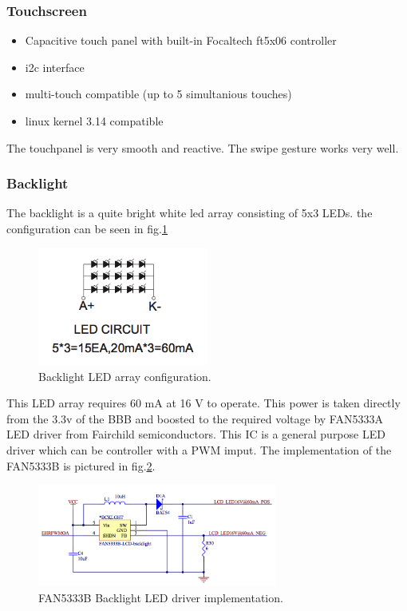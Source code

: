 \subsubsection{Touchscreen}

\begin{itemize}
  \item {Capacitive touch panel with built-in Focaltech ft5x06 controller}
  \item {i2c interface}
  \item {multi-touch compatible (up to 5 simultanious touches)}
  \item {linux kernel 3.14 compatible}
\end{itemize}
The touchpanel is very smooth and reactive. The swipe gesture works very well.

\subsubsection{Backlight}
\label{chap: backlight}
The backlight is a quite bright white led array consisting of 5x3 LEDs. the configuration can be seen in fig.\ref{fig:backlight_led}

\begin{figure}[!htb]
    \centering
    \includegraphics[width=0.5\textwidth,keepaspectratio]{chap/hardFig/backlight_led_circuit}
    \caption{Backlight LED array configuration.}
    \label{fig:backlight_led}
\end{figure}

This LED array requires 60 mA at 16 V to operate. This power is taken directly from the 3.3v of the BBB and boosted to the required voltage by FAN5333A LED driver from Fairchild semiconductors.
This IC is a general purpose LED driver which can be controller with a PWM imput.
The implementation of the FAN5333B is pictured in fig.\ref{fig:backlight driver schematics}.

\begin{figure}[!htb]
    \centering
    \includegraphics[width=0.7\textwidth,keepaspectratio]{chap/hardFig/backlight_led_driver_sch}
    \caption{FAN5333B Backlight LED driver implementation.}
    \label{fig:backlight driver schematics}
\end{figure}

